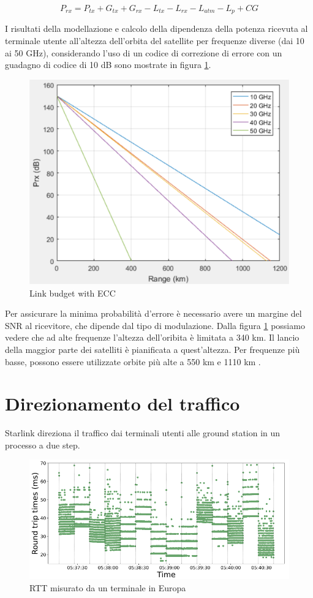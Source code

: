 \begin{equation}
  P_{rx} = P_{tx} + G_{tx} + G_{rx} - L_{tx} - L_{rx} - L_{atm} - L_{p} + CG
\end{equation}

I risultati della modellazione e calcolo della dipendenza della potenza ricevuta al terminale utente all'altezza dell'orbita del satellite per frequenze diverse (dai 10 ai 50 GHz), considerando l'uso di un codice di correzione di errore con un guadagno di codice di 10 dB sono mostrate in figura \ref{fig:link-budget-w-ecc}.

\begin{figure}[htbp]
  \centering
  \includegraphics[width=0.8\linewidth]{./res/img/link_budget_w_ecc.png}
  \caption{Link budget with \ac{ECC}}
  \label{fig:link-budget-w-ecc}
\end{figure}

Per assicurare la minima probabilità d'errore è necessario avere un margine del \ac{SNR} al ricevitore, che dipende dal tipo di modulazione.
Dalla figura \ref{fig:link-budget-w-ecc} possiamo vedere che ad alte frequenze l'altezza dell'oribita è limitata a 340 km.
Il lancio della maggior parte dei satelliti è pianificata a quest'altezza.
Per frequenze più basse, possono essere utilizzate orbite più alte a 550 km e 1110 km \cite{rozenvasser_estimation_2023}.

\section{Direzionamento del traffico}
Starlink direziona il traffico dai terminali utenti alle ground station in un processo a due step.

\begin{figure}[htbp]
  \centering
  \includegraphics[width=0.8\linewidth]{./res/img/rtt_euterminal.png}
  \caption{\ac{RTT} misurato da un terminale in Europa \cite{tanveer_making_2023}}
  \label{fig:rtt-euterminal}
\end{figure}

